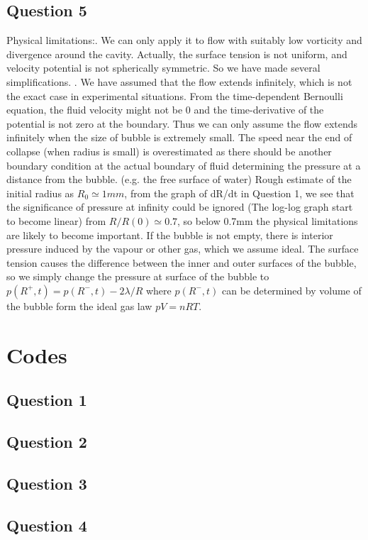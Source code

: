 \documentclass[11pt]{article}
\begin{document}
\subsection{Question 5}
Physical limitations:. We can only apply it to flow with suitably low vorticity and divergence around the cavity. Actually, the surface tension is not uniform, and velocity potential is not spherically symmetric.
So we have made several simplifications. . We have assumed that the flow extends infinitely, which is not the exact case in experimental situations. From the time-dependent Bernoulli equation, the fluid velocity might not be 0 and the time-derivative of the potential is not zero at the boundary. Thus we can only assume the flow extends infinitely when the size of bubble is extremely small.  The speed near the end of collapse (when radius is small) is overestimated as there should be another boundary condition at the actual boundary of fluid determining the pressure at a distance from the bubble. (e.g. the free surface of water)\newline
\newline\newline
Rough estimate of the initial radius as $R_{0} \simeq 1mm$, from the graph of dR/dt in Question 1, we see that the significance of pressure at infinity could be ignored (The log-log graph start to become linear) from $R/R(0) \simeq 0.7$, so below 0.7mm the physical limitations are likely to become important.
If the bubble is not empty, there is interior pressure induced by the vapour or other gas, which we assume ideal. The surface tension causes the difference between the inner and outer surfaces of the bubble, so we simply change the pressure at surface of the bubble to $p(R^{+},t) = p(R^{-},t) - 2\lambda/R$ where $p(R^{-},t)$ can be determined by volume of the bubble form the ideal gas law $pV = nRT$.
\newpage
\appendix
\section{Codes}
\subsection{Question 1}

\subsection{Question 2}

\subsection{Question 3}



\subsection{Question 4}


\end{document}
